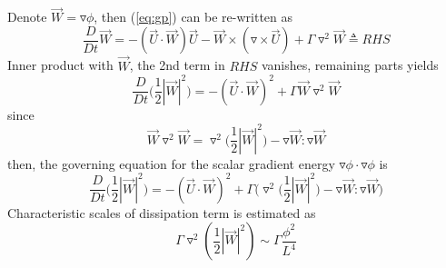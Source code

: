 \documentclass[paper=a4, fontsize=11pt]{scrartcl} %
\numberwithin{equation}{section} %
\numberwithin{figure}{section} %
\numberwithin{table}{section} %
\begin{document}
	Denote $\vec{W} = \triangledown \phi$, then (\ref{eq:gp}) can be re-written as
	\begin{equation}
		\frac{D}{Dt} \vec{W} = -(\vec{U} \cdot \vec{W})\vec{U} - \vec{W} \times (\triangledown \times \vec{U}) + \Gamma \triangledown^2 \vec{W} \triangleq RHS
	\end{equation}
	Inner product with $\vec{W}$, the 2nd term in $RHS$ vanishes, remaining parts yields
	\begin{equation}
		\frac{D}{Dt} \big(\frac{1}{2}|\vec{W}|^2\big) = -(\vec{U} \cdot \vec{W})^2  + \Gamma \vec{W} \triangledown^2 \vec{W}
	\end{equation}
	since
	\begin{equation}
			\vec{W} \triangledown^2 \vec{W} = \triangledown^2 \big(\frac{1}{2}|\vec{W}|^2\big) - \triangledown \vec{W} : \triangledown \vec{W}
	\end{equation}
	then, the governing equation for the scalar gradient energy $\triangledown\phi \cdot \triangledown\phi$ is
	\begin{equation}
		\frac{D}{Dt} \big(\frac{1}{2}|\vec{W}|^2\big) = -(\vec{U} \cdot \vec{W})^2  + \Gamma \Bigg(\triangledown^2 \big(\frac{1}{2}|\vec{W}|^2\big) - \triangledown \vec{W} : \triangledown \vec{W}\Bigg)
	\end{equation}
	Characteristic scales of dissipation term is estimated as
	\begin{equation}
		\Gamma \triangledown^2(\frac{1}{2} |\vec{W}|^2) \sim \Gamma \frac{\phi^2}{L^4}
	\end{equation}
\end{document}
